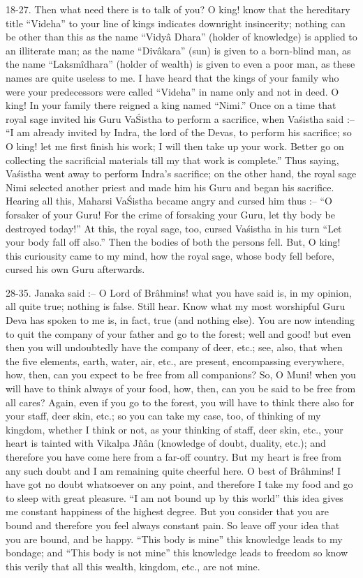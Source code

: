 18-27. Then what need there is to talk of you? O king! know that the hereditary title ``Videha'' to your line of kings indicates downright insincerity; nothing can be other than this as the name ``Vidy\^a Dhara'' (holder of knowledge) is applied to an illiterate man; as the name ``Div\^akara'' (sun) is given to a born-blind man, as the name ``Laksm\^idhara'' (holder of wealth) is given to even a poor man, as these names are quite useless to me. I have heard that the kings of your family who were your predecessors were called ``Videha'' in name only and not in deed. O king! In your family there reigned a king named ``Nimi.'' Once on a time that royal sage invited his Guru Va\'Sistha to perform a sacrifice, when Va\'sistha said :-- ``I am already invited by Indra, the lord of the Devas, to perform his sacrifice; so O king! let me first finish his work; I will then take up your work. Better go on collecting the sacrificial materials till my that work is complete.'' Thus saying, Va\'sistha went away to perform Indra's sacrifice; on the other hand, the royal sage Nimi selected another priest and made him his Guru and began his sacrifice. Hearing all this, Maharsi Va\'Sistha became angry and cursed him thus :-- ``O forsaker of your Guru! For the crime of forsaking your Guru, let thy body be destroyed today!'' At this, the royal sage, too, cursed Va\'sistha in his turn ``Let your body fall off also.'' Then the bodies of both the persons fell. But, O king! this curiousity came to my mind, how the royal sage, whose body fell before, cursed his own Guru afterwards.

28-35. Janaka said :-- O Lord of Br\^ahmins! what you have said is, in my opinion, all quite true; nothing is false. Still hear. Know what my most worshipful Guru Deva has spoken to me is, in fact, true (and nothing else). You are now intending to quit the company of your father and go to the forest; well and good! but even then you will undoubtedly have the company of deer, etc.; see, also, that when the five elements, earth, water, air, etc., are present, encompassing everywhere, how, then, can you expect to be free from all companions? So, O Muni! when you will have to think always of your food, how, then, can you be said to be free from all cares? Again, even if you go to the forest, you will have to think there also for your staff, deer skin, etc.; so you can take my case, too, of thinking of my kingdom, whether I think or not, as your thinking of staff, deer skin, etc., your heart is tainted with Vikalpa Jñ\^an (knowledge of doubt, duality, etc.); and therefore you have come here from a far-off country. But my heart is free from any such doubt and I am remaining quite cheerful here. O best of Br\^ahmins! I have got no doubt whatsoever on any point, and therefore I take my food and go to sleep with great pleasure. ``I am not bound up by this world'' this idea gives me constant happiness of the highest degree. But you consider that you are bound and therefore you feel always constant pain. So leave off your idea that you are bound, and be happy. ``This body is mine'' this knowledge leads to my bondage; and ``This body is not mine'' this knowledge leads to freedom so know this verily that all this wealth, kingdom, etc., are not mine.

